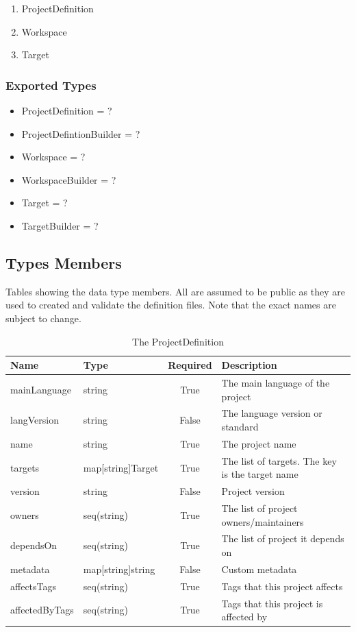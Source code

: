 \documentclass[11pt]{article}
\begin{document}
\begin{enumerate}
\item ProjectDefinition
\item Workspace
\item Target
\end{enumerate}

\subsubsection{Exported Types}
\begin{itemize}
\item ProjectDefinition = ?
\item ProjectDefintionBuilder = ?
\item Workspace = ?
\item WorkspaceBuilder = ?
\item Target = ?
\item TargetBuilder = ?
\end{itemize}

\subsection{Types Members}

Tables showing the data type members. All are assumed to be public as they are
used to created and validate the definition files. Note that the exact names are
subject to change.

\begin{table}[h!]
  \centering
  \begin{tabular}[h!]{l | l | c | l}
    \textbf{Name} & \textbf{Type} & \textbf{Required} & \textbf{Description}\\
    \hline
    mainLanguage & string & True & The main language of the project\\
    \hline
    langVersion & string & False & The language version or standard\\
    \hline
    name & string & True & The project name\\
    \hline
    targets & map[string]Target & True & The list of \glspl{target}. The key is
                                         the target name\\
    \hline
    version & string & False & Project version\\
    \hline
    owners & seq(string) & True & The list of project owners/maintainers\\
    \hline
    dependsOn & seq(string) & True & The list of project it depends on\\
    \hline
    metadata & map[string]string & False & Custom metadata\\
    \hline
    affectsTags & seq(string) & True & Tags that this project affects\\
    \hline
    affectedByTags & seq(string) & True & Tags that this project is affected by
  \end{tabular}
  \caption{The ProjectDefinition}
  \label{table:proj_def}
\end{table}
\end{document}
